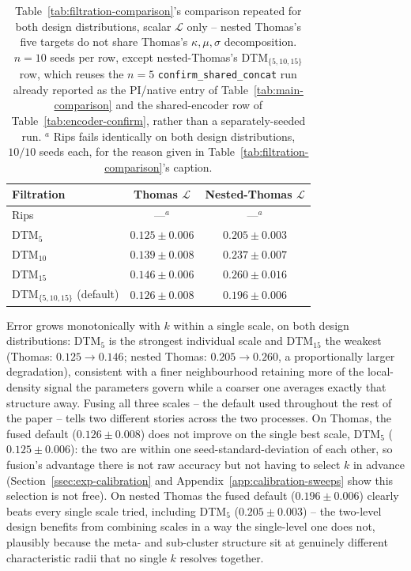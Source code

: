 \documentclass[11pt,letterpaper]{article}
\newcommand{\1}{\mathds{1}}
\theoremstyle{plain}
\theoremstyle{definitioncolon}
\begin{document}
\begin{table}[tbp]
\centering
\small
\begin{tabular}{lcc}
\toprule
Filtration & Thomas $\mathcal{L}$ & Nested-Thomas $\mathcal{L}$ \\
\midrule
Rips                          & ---$^a$           & ---$^a$ \\
DTM$_5$                       & $0.125 \pm 0.006$ & $0.205 \pm 0.003$ \\
DTM$_{10}$                    & $0.139 \pm 0.008$ & $0.237 \pm 0.007$ \\
DTM$_{15}$                    & $0.146 \pm 0.006$ & $0.260 \pm 0.016$ \\
DTM$_{\{5,10,15\}}$ (default) & $0.126 \pm 0.008$ & $0.196 \pm 0.006$ \\
\bottomrule
\end{tabular}
\caption{Table~\ref{tab:filtration-comparison}'s comparison repeated for both
design distributions, scalar $\mathcal{L}$ only -- nested Thomas's five
targets do not share Thomas's $\kappa,\mu,\sigma$ decomposition. $n=10$ seeds
per row, except nested-Thomas's DTM$_{\{5,10,15\}}$ row, which reuses the
$n=5$ \texttt{confirm\_shared\_concat} run already reported as the PI/native
entry of Table~\ref{tab:main-comparison} and the shared-encoder row of
Table~\ref{tab:encoder-confirm}, rather than a separately-seeded run.
$^a$ Rips fails identically on both design distributions, $10/10$ seeds each,
for the reason given in Table~\ref{tab:filtration-comparison}'s caption.}
\label{tab:filtration-comparison-nt}
\end{table}

Error grows monotonically with $k$ within a single scale, on both design
distributions: DTM$_5$ is the strongest individual scale and DTM$_{15}$ the
weakest (Thomas: $0.125\to0.146$; nested Thomas: $0.205\to0.260$, a
proportionally larger degradation), consistent with a finer neighbourhood
retaining more of the local-density signal the parameters govern while a
coarser one averages exactly that structure away. Fusing all three scales --
the default used throughout the rest of the paper -- tells two different
stories across the two processes. On Thomas, the fused default
($0.126\pm0.008$) does not improve on the single best scale, DTM$_5$
($0.125\pm0.006$): the two are within one seed-standard-deviation of each
other, so fusion's advantage there is not raw accuracy but not having to
select $k$ in advance (Section~\ref{ssec:exp-calibration} and
Appendix~\ref{app:calibration-sweeps} show this selection is not free). On
nested Thomas the fused default ($0.196\pm0.006$) clearly beats every single
scale tried, including DTM$_5$ ($0.205\pm0.003$) -- the two-level design
benefits from combining scales in a way the single-level one does not,
plausibly because the meta- and sub-cluster structure sit at genuinely
different characteristic radii that no single $k$ resolves together.
\end{document}

